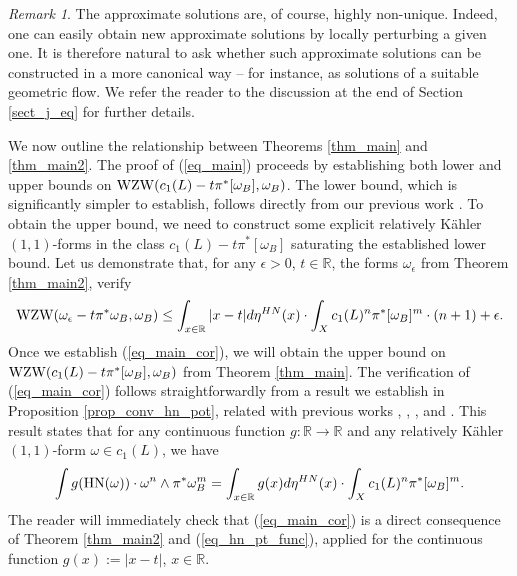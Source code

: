 \documentclass[12pt]{article}
\numberwithin{equation}{section}
\theoremstyle{theorem}
\theoremstyle{definition}
\theoremstyle{remark}
\newtheorem{rem}[thm]{Remark}
\newcommand{\real}{\mathbb{R}}
\begin{document}
	\begin{rem}
		The approximate solutions are, of course, highly non-unique. 
		Indeed, one can easily obtain new approximate solutions by locally perturbing a given one. 
		It is therefore natural to ask whether such approximate solutions can be constructed in a more canonical way -- for instance, as solutions of a suitable geometric flow. 
		We refer the reader to the discussion at the end of Section \ref{sect_j_eq} for further details.
	\end{rem}
	\par 
	We now outline the relationship between Theorems \ref{thm_main} and \ref{thm_main2}. 
	The proof of (\ref{eq_main}) proceeds by establishing both lower and upper bounds on ${\rm{WZW}}(c_1(L) - t \pi^* [\omega_B], \omega_B)$. 
	The lower bound, which is significantly simpler to establish, follows directly from our previous work \cite{FinHNII}.
	To obtain the upper bound, we need to construct some explicit relatively Kähler $(1,1)$-forms in the class $c_1(L) - t \pi^* [\omega_B]$ saturating the established lower bound.
	Let us demonstrate that, for any $\epsilon > 0$, $t \in \real$, the forms $\omega_{\epsilon}$ from Theorem \ref{thm_main2}, verify
	\begin{equation}\label{eq_main_cor}
		{\rm{WZW}}(\omega_{\epsilon} - t \pi^* \omega_B, \omega_B) 
		\leq 
		\int_{x \in \real} |x - t| d \eta^{HN}(x)
		\cdot
		\int_X c_1(L)^n \pi^* [\omega_B]^m
		\cdot
		(n + 1)
		+
		\epsilon.
	\end{equation}
	Once we establish (\ref{eq_main_cor}), we will obtain the upper bound on ${\rm{WZW}}(c_1(L) - t \pi^* [\omega_B], \omega_B)$ from Theorem \ref{thm_main}.
	The verification of (\ref{eq_main_cor}) follows straightforwardly from a result we establish in Proposition \ref{prop_conv_hn_pot}, related with previous works \cite{ChenHNolyg}, \cite{BouckChen}, \cite{NystOkounTest}, \cite{HisamSpecMeas} and \cite{FinSubmToepl}. 
	This result states that for any continuous function $g : \real \to \real$ and any relatively Kähler $(1,1)$-form $\omega \in c_1(L)$, we have
	\begin{equation}\label{eq_hn_pt_func}
		\int g({\rm{HN}}(\omega)) \cdot \omega^n \wedge \pi^* \omega_B^m
		=
		\int_{x \in \real} g(x) d \eta^{HN}(x)
		\cdot
		\int_X c_1(L)^n \pi^* [\omega_B]^m.
	\end{equation}
	The reader will immediately check that (\ref{eq_main_cor}) is a direct consequence of Theorem \ref{thm_main2} and (\ref{eq_hn_pt_func}), applied for the continuous function $g(x) := |x - t|$, $x \in \real$.
\end{document}
